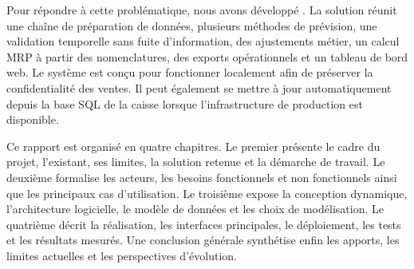 Pour répondre à cette problématique, nous avons développé \NomProjet. La solution
réunit une chaîne de préparation de données, plusieurs méthodes de prévision, une
validation temporelle sans fuite d'information, des ajustements métier, un calcul
MRP à partir des nomenclatures, des exports opérationnels et un tableau de bord
web. Le système est conçu pour fonctionner localement afin de préserver la
confidentialité des ventes. Il peut également se mettre à jour automatiquement
depuis la base SQL de la caisse lorsque l'infrastructure de production est
disponible.

Ce rapport est organisé en quatre chapitres. Le premier présente le cadre du
projet, l'existant, ses limites, la solution retenue et la démarche de travail. Le
deuxième formalise les acteurs, les besoins fonctionnels et non fonctionnels ainsi
que les principaux cas d'utilisation. Le troisième expose la conception dynamique,
l'architecture logicielle, le modèle de données et les choix de modélisation. Le
quatrième décrit la réalisation, les interfaces principales, le déploiement, les
tests et les résultats mesurés. Une conclusion générale synthétise enfin les
apports, les limites actuelles et les perspectives d'évolution.

